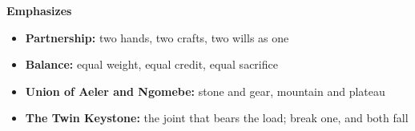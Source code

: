\noindent\textbf{Emphasizes}
\begin{itemize}
  \item \textbf{Partnership:} two hands, two crafts, two wills as one
  \item \textbf{Balance:} equal weight, equal credit, equal sacrifice
  \item \textbf{Union of Aeler and Ngomebe:} stone and gear, mountain and plateau
  \item \textbf{The Twin Keystone:} the joint that bears the load; break one, and both fall
\end{itemize}